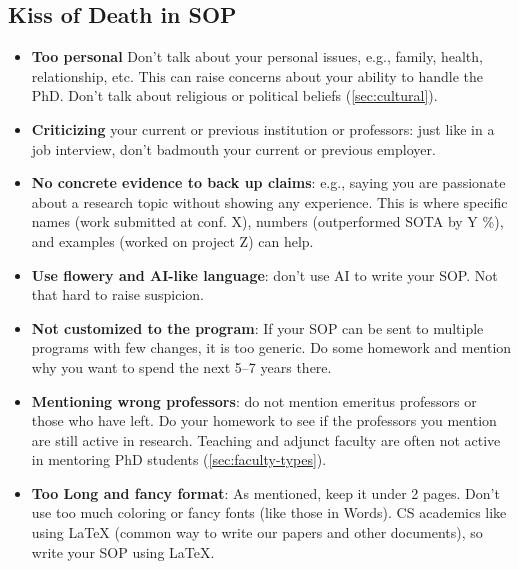 \documentclass[oneside,11pt,dvipsnames]{book}
\begin{document}
\subsection{Kiss of Death in SOP} \label{sec:kiss-of-death-sop}

\begin{itemize}
\item \textbf{Too personal} Don't talk about your personal issues, e.g., family, health, relationship, etc. This can raise concerns about your ability to handle the PhD. Don't talk about religious or political beliefs (\autoref{sec:cultural}).
\item \textbf{Criticizing} your current or previous institution or professors: just like in a job interview, don't badmouth your current or previous employer. 
\item \textbf{No concrete evidence to back up claims}: e.g., saying you are passionate about a research topic without showing any experience. This is where specific names (work submitted at conf. X), numbers (outperformed SOTA by Y \%), and examples (worked on project Z) can help. 
\item \textbf{Use flowery and AI-like language}: don't use AI to write your SOP. Not that hard to raise suspicion.
\item \textbf{Not customized to the program}: If your SOP can be sent to multiple programs with few changes, it is too generic. Do some homework and mention why you want to spend the next 5--7 years there.
\item \textbf{Mentioning wrong professors}: do not mention emeritus professors or those who have left.  Do your homework to see if the professors you mention are still active in research.  Teaching and adjunct faculty are often not active in mentoring PhD students (\autoref{sec:faculty-types}).
\item \textbf{Too Long and fancy format}: As mentioned, keep it under 2 pages. Don't use too much coloring or fancy fonts (like those in Words). CS academics like using LaTeX (common way to write our papers and other documents), so write your SOP using LaTeX. 
\end{itemize}
\end{document}

